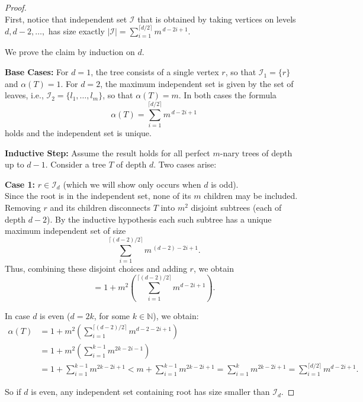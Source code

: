 \documentclass{amsart}
\theoremstyle{definition}
\newcommand\II{{\mathcal I}}
\begin{document}
\begin{proof}
	$ $
	\\
	First, notice that independent set $\II$ that is obtained by taking vertices on levels $d, d-2, \ldots, $ has size exactly $|\II|=\displaystyle{\sum_{i=1}^{\lceil d/2 \rceil} m^{\,d-2i+1}}.$

	We prove the claim by induction on $d$.

	\textbf{Base Cases:}
	For $d=1$, the tree consists of a single vertex $r$, so that $\mathcal{I}_1=\{r\}$ and $\alpha(T)=1$. For $d=2$, the maximum independent set is given by the set of leaves, i.e., $\mathcal{I}_2=\{l_1,\dots,l_m\}$, so that $\alpha(T)=m$. In both cases the formula
	\[
		\alpha(T)=\sum_{i=1}^{\lceil d/2 \rceil} m^{\,d-2i+1}
	\]
	holds and the independent set is unique.

	\medskip

	\textbf{Inductive Step:}
	Assume the result holds for all perfect $m$-nary trees of depth up to $d - 1$. Consider a tree $T$ of depth $d$. Two cases arise:

	\medskip

	\textbf{Case 1:} $r\in \mathcal{I}_{d}$ (which we will show only occurs when $d$ is odd).\\[1mm]
	Since the root is in the independent set, none of its $m$ children may be included. Removing $r$ and its children disconnects $T$ into $m^2$ disjoint subtrees (each of depth $d-2$). By the inductive hypothesis each such subtree has a unique maximum independent set of size
	\[
		\sum_{i=1}^{\lceil (d-2)/2 \rceil} m^{\, (d-2)-2i+1}.
	\]
	Thus, combining these disjoint choices and adding $r$, we obtain
	\[
		= 1 + m^2\left(\sum_{i=1}^{\lceil (d-2)/2 \rceil} m^{d-2i+1}\right).
	\]

	In case $d$ is even ($d = 2k$, for some $k \in \mathbb{N}$), we obtain:
	\begin{align*}
		\alpha(T) & = 1 + m^2\left(\sum_{i=1}^{\lceil (d-2)/2 \rceil} m^{d - 2 -2i+1}\right)                                                                         \\
		          & = 1 + m^2\left(\sum_{i=1}^{k-1} m^{2k-2i-1}\right)                                                                                               \\
		          & = 1 + \sum_{i=1}^{k-1} m^{2k-2i+1} < m + \sum_{i=1}^{k-1} m^{2k-2i+1} = \sum_{i=1}^{k} m^{2k-2i+1} = \sum_{i = 1}^{\lceil d/2 \rceil}m^{d-2i+1}.
	\end{align*}

	So if $d$ is even, any independent set containing root has size smaller than $\II_d$.
	\newline


\end{proof}
\end{document}
